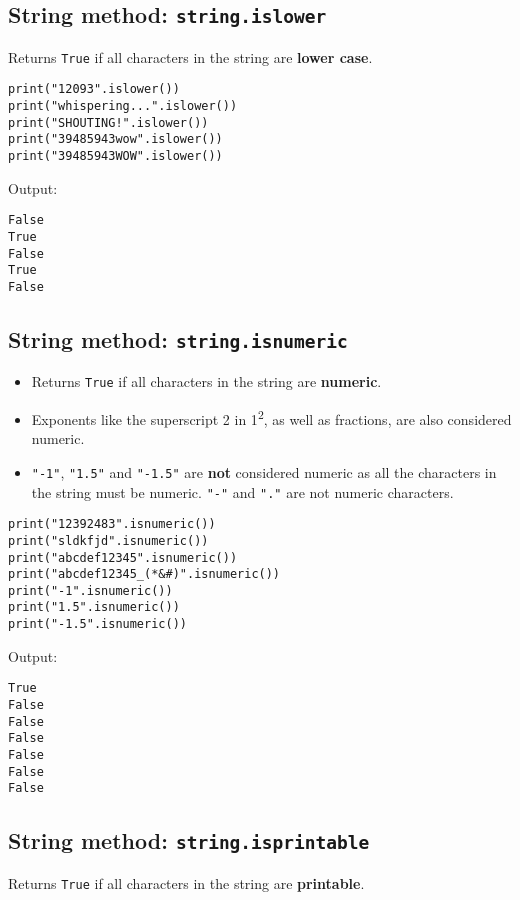 \documentclass[11pt]{article}
\begin{document}
\subsection{String method: \texttt{string.islower}}
\label{sec:org287c424}
Returns \texttt{True} if all characters in the string are \textbf{lower case}.

\begin{verbatim}
print("12093".islower())
print("whispering...".islower())
print("SHOUTING!".islower())
print("39485943wow".islower())
print("39485943WOW".islower())
\end{verbatim}

 \noindent Output:

\begin{verbatim}
False
True
False
True
False
\end{verbatim}


 \newpage

\subsection{String method: \texttt{string.isnumeric}}
\label{sec:org15bee9c}
\begin{itemize}
\item Returns \texttt{True} if all characters in the string are \textbf{numeric}.
\item Exponents like the superscript 2 in 1\textsuperscript{2}, as well as fractions, are also considered numeric.
\item \texttt{"-1"}, \texttt{"1.5"} and \texttt{"-1.5"} are \textbf{not} considered numeric as all the characters in the string must be numeric. \texttt{"-"} and \texttt{"."} are not numeric characters.
\end{itemize}

\begin{verbatim}
print("12392483".isnumeric())
print("sldkfjd".isnumeric())
print("abcdef12345".isnumeric())
print("abcdef12345_(*&#)".isnumeric())
print("-1".isnumeric())
print("1.5".isnumeric())
print("-1.5".isnumeric())
\end{verbatim}

 \noindent Output:

\begin{verbatim}
True
False
False
False
False
False
False
\end{verbatim}

\subsection{String method: \texttt{string.isprintable}}
\label{sec:orgcc1c59c}
Returns \texttt{True} if all characters in the string are \textbf{printable}.
\end{document}
